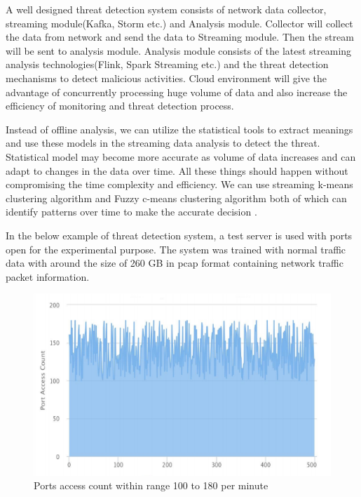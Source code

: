 \documentclass[sigconf]{acmart}
\begin{document}
A well designed threat detection system consists of network data collector, streaming module(Kafka, Storm etc.) and Analysis module. Collector will collect the data from network and send the data to Streaming module. Then the stream will be sent to analysis module. Analysis module consists of the latest streaming analysis technologies(Flink, Spark Streaming etc.) and the threat detection mechanisms to detect malicious activities. Cloud environment will give the advantage of concurrently processing huge volume of data and also increase the efficiency of monitoring and threat detection process.  

Instead of offline analysis, we can utilize the statistical tools to extract meanings and use these models in the streaming data analysis to detect the threat. Statistical model may become more accurate as volume of data increases and can adapt to changes in the data over time. All these things should happen without compromising the time complexity and efficiency. We can use streaming k-means clustering algorithm and Fuzzy c-means clustering algorithm both of which can identify patterns over time to make the accurate decision \cite{streaming-based-network-monitoring-and-threat-detection-system}.

In the below example of threat detection system, a test server is used with ports open for the experimental purpose. The system was trained with normal traffic data with around the size of 260 GB in pcap format containing network traffic packet information. 

\begin{figure}[htb]
  \centering
  \includegraphics[width=1.0\columnwidth]{images/Figure5.png}
  \caption{Ports access count within range 100 to 180 per minute
  \cite{streaming-based-network-monitoring-and-threat-detection-system}}
  \label{fig:Figure5} 
\end{figure}
\end{document}

